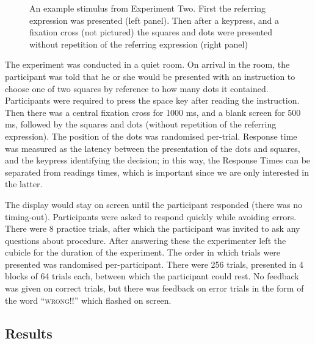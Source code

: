 \documentclass[doc,apacite]{apa6}
\begin{document}
\begin{figure}[tbp]
\caption{An example stimulus from Experiment Two. First the referring expression was presented (left panel). Then after a keypress, and a fixation cross (not pictured) the squares and dots were presented without repetition of the referring expression (right panel)}
\label{stimuluse2}
\end{figure}


The experiment was conducted in a quiet room. On arrival in the room, the participant was told that he or she would be presented with an instruction to choose one of two squares by reference to how many dots it contained. Participants were required to press the space key after reading the instruction. Then there was a central fixation cross for 1000 ms, and a blank screen for 500 ms, followed by the squares and dots (without repetition of the referring expression).  The position of the dots was randomised per-trial. Response time was measured as the latency between the presentation of the dots and squares, and the keypress identifying the decision; in this way, the Response Times can be separated from readings times, which is important since we are only interested in the latter. %

The display would stay on screen until the participant responded (there was no timing-out). Participants were asked to respond quickly while avoiding errors. There were 8 practice trials, after which the participant was invited to ask any questions about procedure. After answering these the experimenter left the cubicle for the duration of the experiment. The order in which trials were presented was randomised per-participant. There were 256 trials, presented in 4 blocks of 64 trials each, between which the participant could rest. No feedback was given on correct trials, but there was feedback on error trials in the form of the word ``\textsc{wrong!!}'' which flashed on screen.

\subsection{Results}
\end{document}
